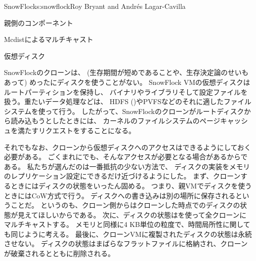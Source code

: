 \begin{aosachapter}{SnowFlock}{s:snowflock}{Roy Bryant and Andr\'e{s} Lagar-Cavilla}
\begin{aosasect1}{親側のコンポーネント}
\begin{aosasect2}{Mcdistによるマルチキャスト}
\begin{aosaitemize}
\end{aosaitemize}

\end{aosasect2}

\begin{aosasect2}{仮想ディスク}

SnowFlockのクローンは、
(生存期間が短めであることや、生存決定論のせいもあって)
めったにディスクを使うことがない。
SnowFlock VMの仮想ディスクはルートパーティションを保持し、
バイナリやライブラリそして設定ファイルを扱う。重たいデータ処理などは、
HDFS ()やPVFSなどのそれに適したファイルシステムを使って行う。
したがって、SnowFlockのクローンがルートディスクから読み込もうとしたときには、
カーネルのファイルシステムのページキャッシュを満たすリクエストをすることになる。

それでもなお、クローンから仮想ディスクへのアクセスはできるようにしておく必要がある。
ごくまれにでも、そんなアクセスが必要となる場合があるからである。
私たちが選んだのは一番抵抗の少ない方法で、
ディスクの実装をメモリのレプリケーション設定にできるだけ近づけるようにした。
まず、クローンするときにはディスクの状態をいったん固める。
つまり、親VMでディスクを使うときにはCoW方式で行う。
ディスクへの書き込みは別の場所に保存されるということだ。
というのも、クローン側からはクローンした時点でのディスクの状態が見えてほしいからである。
次に、ディスクの状態はを使って全クローンにマルチキャストする。
メモリと同様に4 KB単位の粒度で、時間局所性に関しても同じように考える。
最後に、クローンVMに複製されたディスクの状態は永続させない。
ディスクの状態はまばらなフラットファイルに格納され、クローンが破棄されるとともに削除される。


\end{aosasect2}
\end{aosasect1}
\end{aosachapter}
